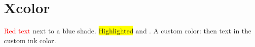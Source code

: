 \documentclass{article}
\begin{document}
\section{Xcolor}
\textcolor{red}{Red text} next to \textcolor{blue!60}{a blue shade}.
\colorbox{yellow}{Highlighted} and .
A custom color:  then
\textcolor{ink}{text in the custom ink color}.
\end{document}

